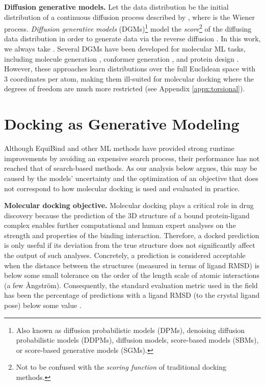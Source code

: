 \documentclass{article} \usepackage{iclr2023_conference,times}
\newcommand{\new}[1]{#1}
\begin{document}
\textbf{Diffusion generative models.} Let the data distribution be the initial distribution  of a continuous diffusion process described by , where  is the Wiener process. \emph{Diffusion generative models} (DGMs)\footnote{Also known as diffusion probabilistic models (DPMs), denoising diffusion probabilistic models (DDPMs), diffusion models, score-based models (SBMs), or score-based generative models (SGMs).} model the \emph{score}\footnote{Not to be confused with the \emph{scoring function} of traditional docking methods.}  of the diffusing data distribution in order to generate data via the reverse diffusion  \citep{song2021score}. In this work, we always take . Several DGMs have been developed for molecular ML tasks, including molecule generation \citep{hoogeboom2022equivariant}, conformer generation \citep{xu2021geodiff}, and protein design \citep{trippe2022diffusion}. However, these approaches learn distributions over the full Euclidean space  with 3 coordinates per atom, making them ill-suited for molecular docking where the degrees of freedom are much more restricted \new{(see Appendix \ref{appx:torsional})}. 


\section{Docking as Generative Modeling}\label{sec:generative_modeling}

Although EquiBind and other ML methods have provided strong runtime improvements by avoiding an expensive search process, their performance has not reached that of search-based methods. As our analysis below argues, this may be caused by the models' uncertainty and the optimization of an objective that does not correspond to how molecular docking is used and evaluated in practice. 

\textbf{Molecular docking objective.} Molecular docking plays a critical role in drug discovery because the prediction of the 3D structure of a bound protein-ligand complex enables further computational and human expert analyses on the strength and properties of the binding interaction. Therefore, a docked prediction is only useful if its deviation from the true structure does not significantly affect the output of such analyses. Concretely, a prediction is considered acceptable when the distance between the structures (measured in terms of ligand RMSD) is below some small tolerance on the order of the length scale of atomic interactions (a few \AA{}ngstr\"om). Consequently, the standard evaluation metric used in the field has been the percentage of predictions with a ligand RMSD (to the crystal ligand pose) below some value . 
\end{document}
